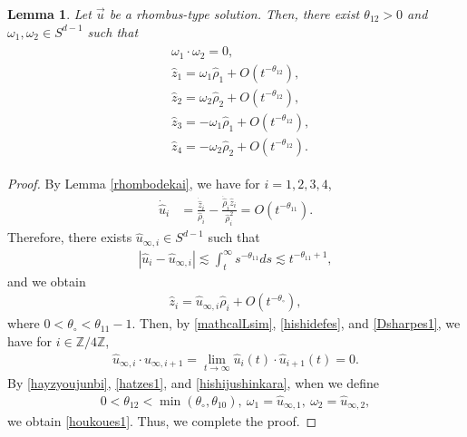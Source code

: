 \documentclass[10pt,a4paper]{amsart}
\newtheorem{lemma}[theorem]{Lemma}
\numberwithin{equation}{section}
\begin{document}
\begin{lemma}\label{houkourhombus}
Let $\vec{u}$ be a rhombus-type solution. Then, there exist $\theta_{12}>0$ and  $\omega_1,\omega_2\in S^{d-1}$ such that 
\begin{align}\label{houkoues1}
\begin{aligned}
&\omega_1\cdot \omega_2=0,
\\
&\hat{z}_1=\omega_1\hat{\rho}_1+O\left(t^{-\theta_{12}}\right),
\\
&\hat{z}_2=\omega_2\hat{\rho}_2+O\left(t^{-\theta_{12}}\right),
\\
&\hat{z}_3=-\omega_1\hat{\rho}_1+O\left(t^{-\theta_{12}}\right),
\\
&\hat{z}_4=-\omega_2\hat{\rho}_2+O\left(t^{-\theta_{12}}\right).
\end{aligned}
\end{align}
\end{lemma}


\begin{proof}
By Lemma \ref{rhombodekai}, we have for $i=1,2,3,4$,
\begin{align*}
\dot{\hat{u}}_i&=\frac{\dot{\hat{z}}_i}{\hat{\rho}_i}-\frac{\dot{\hat{\rho}}_i\hat{z}_i}{\hat{\rho}_i^2}=O\left(t^{-\theta_{11}}\right).
\end{align*}
Therefore, there exists $\hat{u}_{\infty,i}\in S^{d-1}$ such that
\begin{align*}
\left|\hat{u}_i-\hat{u}_{\infty,i}\right|\lesssim  \int_t^{\infty}s^{-\theta_{11}}ds\lesssim t^{-\theta_{11}+1},
\end{align*}
and we obtain
\begin{align}\label{hatzes1}
\hat{z}_i=\hat{u}_{\infty,i}\hat{\rho}_i+O\left(t^{-\theta_{\circ}}\right),
\end{align}
where $0<\theta_{\circ}<\theta_{11}-1$. Then, by \eqref{mathcalLsim}, \eqref{hishidefes}, and \eqref{Dsharpes1}, we have for $i\in\mathbb{Z}/4\mathbb{Z}$, 
\begin{align}\label{hishijushinkara}
\hat{u}_{\infty,i}\cdot \hat{u}_{\infty,i+1}=\lim_{t\to\infty} \hat{u}_i(t)\cdot \hat{u}_{i+1}(t)=0.
\end{align}
By \eqref{hayzyoujunbi}, \eqref{hatzes1}, and \eqref{hishijushinkara}, when we define
\begin{align*}
0<\theta_{12}<\min{(\theta_{\circ},\theta_{10})},\ \omega_1=\hat{u}_{\infty,1},\ \omega_2=\hat{u}_{\infty,2},
\end{align*}
we obtain \eqref{houkoues1}. Thus, we complete the proof.
\end{proof}
\end{document}
